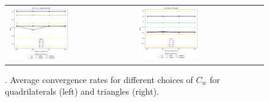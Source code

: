 \begin{figure}[h!]
	\centering
	\begin{tabular}{p{} p{}}
		\vspace{0pt} 
        \includegraphics[width=0.49\textwidth]{../figs/parametric/diffusion_2D/ord_laplace_2_4}
		&
		\vspace{0pt} 
        \includegraphics[width=0.49\textwidth]{../figs/parametric/diffusion_2D/ord_laplace_2_3}
	\end{tabular}
	\caption{. Average convergence rates for different choices of $C_w$ 
	for quadrilaterals (left) and triangles (right).}
	\label{fig:orders_lapalce}
\end{figure}



